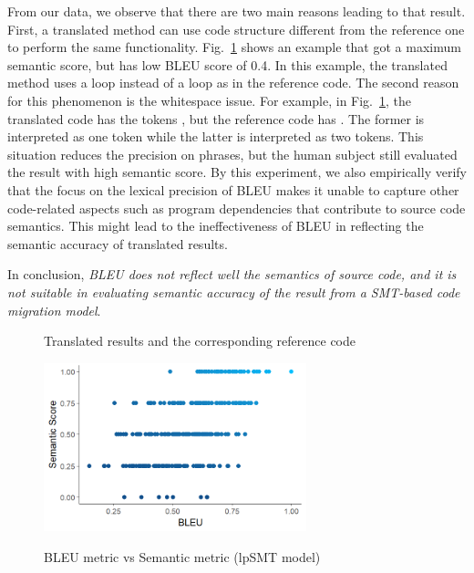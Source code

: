 From our data, we observe that there are two main reasons leading to
that result.
%
First, a translated method can use code structure different from the
reference one to perform the same
functionality. Fig.~\ref{fig:mppSMT_example} shows an example that got
a maximum semantic score, but has low BLEU score of 0.4. In this
example, the translated method uses a  loop instead of a
 loop as in the reference code. The second reason
for this phenomenon is the whitespace issue. For example, in
Fig.~\ref{fig:mppSMT_example}, the translated code has the tokens
, but the reference code has . The
former is interpreted as one token while the latter is interpreted as
two tokens.  This situation reduces the precision on phrases, but the
human subject still evaluated the result with high semantic score. By
this experiment, we also empirically verify that the focus on the
lexical precision of BLEU makes it unable to capture other
code-related aspects such as program dependencies that contribute to
source code semantics. This might lead to the ineffectiveness of BLEU
in reflecting the semantic accuracy of translated results.


In conclusion, {\em BLEU does not reflect well the
semantics of source code, and it is not suitable in evaluating
semantic accuracy of the result from a SMT-based code migration model}.

\begin{figure}[t]
\centering

\caption{Translated results and the corresponding reference code}
\label{fig:mppSMT_example}
\end{figure}




\begin{figure}
\caption{BLEU metric vs Semantic metric (lpSMT model)}
\centering
\includegraphics[width=3in]{img/bleuvssemantic_lpSMT.png}
\label{fig:BleuSemlpSMT}
\end{figure}

